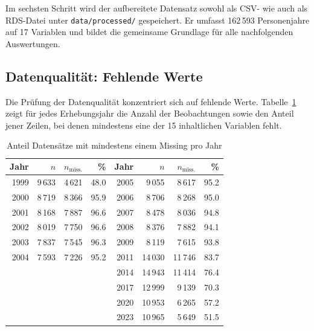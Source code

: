 Im sechsten Schritt wird der aufbereitete Datensatz sowohl als CSV- wie auch als
RDS-Datei unter \texttt{data/processed/} gespeichert. Er umfasst 162\,593
Personenjahre auf 17 Variablen und bildet die gemeinsame Grundlage für alle
nachfolgenden Auswertungen.



\subsection{Datenqualität: Fehlende Werte}
\label{subsec:datenqualitaet}

Die Prüfung der Datenqualität konzentriert sich auf fehlende Werte. Tabelle~\ref{tab:missing}
zeigt für jedes Erhebungsjahr die Anzahl der Beobachtungen sowie den Anteil jener Zeilen,
bei denen mindestens eine der 15 inhaltlichen Variablen fehlt.

\begin{table}[h]
\centering
\caption{Anteil Datensätze mit mindestens einem Missing pro Jahr}
\label{tab:missing}
\begin{tabular}{rrrr@{\hspace{2em}}rrrr}
\toprule
Jahr & $n$ & $n_{\text{miss.}}$ & \% &
Jahr & $n$ & $n_{\text{miss.}}$ & \% \\
\midrule
1999 & 9\,633  & 4\,621  & 48.0 & 2005 & 9\,055  & 8\,617  & 95.2 \\
2000 & 8\,719  & 8\,366  & 95.9 & 2006 & 8\,706  & 8\,268  & 95.0 \\
2001 & 8\,168  & 7\,887  & 96.6 & 2007 & 8\,478  & 8\,036  & 94.8 \\
2002 & 8\,019  & 7\,750  & 96.6 & 2008 & 8\,376  & 7\,882  & 94.1 \\
2003 & 7\,837  & 7\,545  & 96.3 & 2009 & 8\,119  & 7\,615  & 93.8 \\
2004 & 7\,593  & 7\,226  & 95.2 & 2011 & 14\,030 & 11\,746 & 83.7 \\
     &         &         &      & 2014 & 14\,943 & 11\,414 & 76.4 \\
     &         &         &      & 2017 & 12\,999 & 9\,139  & 70.3 \\
     &         &         &      & 2020 & 10\,953 & 6\,265  & 57.2 \\
     &         &         &      & 2023 & 10\,965 & 5\,649  & 51.5 \\
\bottomrule
\end{tabular}
\end{table}

